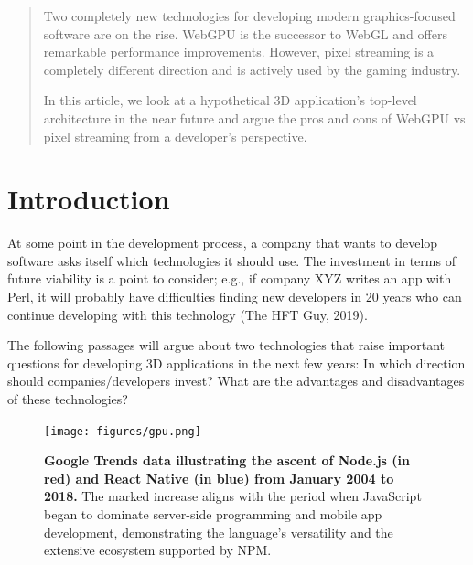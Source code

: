 \documentclass[10pt]{article}
\begin{document}
\begin{sloppypar}
  \begin{abstract}
    Two completely new technologies for developing modern graphics-focused software are on the rise. WebGPU is the successor to WebGL and offers remarkable performance improvements. However, pixel streaming is a completely different direction and is actively used by the gaming industry.

    In this article, we look at a hypothetical 3D application’s top-level architecture in the near future and argue the pros and cons of WebGPU vs pixel streaming from a developer’s perspective.
  \end{abstract}

  \pagebreak
  \tableofcontents
  \pagebreak
  \listoffigures
  \pagebreak
  \listoftables
  \pagebreak
  \lstlistoflistings
  \pagebreak


  \section{Introduction}
  \label{sec:introduction}

  At some point in the development process, a company that wants to develop software asks itself which technologies it should use. The investment in terms of future viability is a point to consider; e.g., if company XYZ writes an app with Perl, it will probably have difficulties finding new developers in 20 years who can continue developing with this technology (The HFT Guy, 2019).

  The following passages will argue about two technologies that raise important questions for developing 3D applications in the next few years: In which direction should companies/developers invest? What are the advantages and disadvantages of these technologies?

  \begin{figure}[ht]
    \centering
    \texttt{[image: figures/gpu.png]}
    \caption[Google Trends data illustrating the ascent of Node.js and React Native.]{\textbf{Google Trends data illustrating the ascent of Node.js (in red) and React Native (in blue) from January 2004 to 2018.} The marked increase aligns with the period when JavaScript began to dominate server-side programming and mobile app development, demonstrating the language’s versatility and the extensive ecosystem supported by NPM.}
    \label{fig:gpu}
  \end{figure}


\end{sloppypar}
\end{document}
